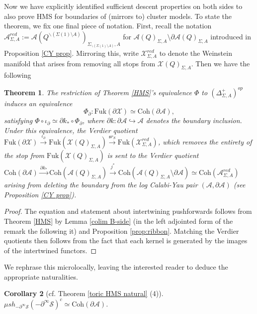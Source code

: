 \documentclass[11pt]{amsart}
\newtheorem{thm}{Theorem}[section]
\newtheorem{cor}[thm]{Corollary}
\theoremstyle{definition}
\theoremstyle{remark}
\newcommand{\A}{\mathcal{A}}
\newcommand{\X}{\mathcal{X}}
\newcommand{\Coh}{\mathrm{Coh}}
\newcommand{\Fuk}{\mathrm{Fuk}}
\numberwithin{equation}{section}
\begin{document}
Now we have explicitly identified sufficient descent properties on both sides to also prove HMS for boundaries of (mirrors to) cluster models. To state the theorem, we fix one final piece of notation. First, recall the notation $\A^{red}_{\Sigma, A} := \mathcal{A}(Q^{\backslash (\Sigma(1) \setminus A)})_{\Sigma_{\backslash (\Sigma(1) \setminus A)}, A}$ for $\mathcal{A}(Q)_{\Sigma, A} \setminus \partial \mathcal{A}(Q)_{\Sigma, A}$ introduced in Proposition \ref{CY prop}. Mirroring this, write $\X_{\Sigma, A}^{red}$ to denote the Weinstein manifold that arises from removing all stops from $\mathcal{X}(Q)_{\Sigma, A}$. Then we have the following
 
\begin{thm}\label{boundary HMS} The restriction of Theorem \ref{HMS}'s equivalence $\Phi$ to $(\Delta^+_{\Sigma,A})^{op}$ induces an equivalence $$\Phi_\partial\colon \Fuk(\partial \X) \simeq \Coh(\partial \A),$$ satisfying $\Phi\circ\iota_\partial\simeq\partial k_*\circ\Phi_\partial$, where $\partial k:\partial\mathcal A\hookrightarrow\mathcal A$ denotes the boundary inclusion.\\
    
Under this equivalence, the Verdier quotient $\Fuk(\partial \X) \xrightarrow{\iota_\partial} \Fuk(\mathcal{X}(Q)_{\Sigma,A})\xrightarrow{\mathfrak sr_S} \Fuk(\X^{red}_{\Sigma, A})$, which removes the entirety of the stop from $\Fuk(\mathcal{X}(Q)_{\Sigma,A})$ is sent to the Verdier quotient $\Coh(\partial \A) \xrightarrow{\partial k_*} \Coh(\mathcal{A}(Q)_{\Sigma,A})\xrightarrow{j^*} \Coh(\mathcal{A}(Q)_{\Sigma,A}\setminus \partial \A) \simeq \Coh(\A^{red}_{\Sigma, A})$ arising from deleting the boundary from the log Calabi-Yau pair $(\A, \partial \A)$ (see Proposition \ref{CY prop}).
\end{thm}
 
\begin{proof}
The equation and statement about intertwining pushforwards follows from Theorem \ref{HMS} by Lemma \ref{colim B-side} (in the left adjointed form of the remark the following it) and Proposition \ref{prop:ribbon}. Matching the Verdier quotients then follows from the fact that each kernel is generated by the images of the intertwined functors.
\end{proof}

We rephrase this microlocally, leaving the interested reader to deduce the appropriate naturalities.

\begin{cor}[cf. Theorem \ref{toric HMS natural} (4)]
$\mu sh_{-\partial^\infty\mathcal S}(-\partial^\infty\mathcal S)^c \simeq \Coh(\partial \A)$. \end{cor}
\end{document}
